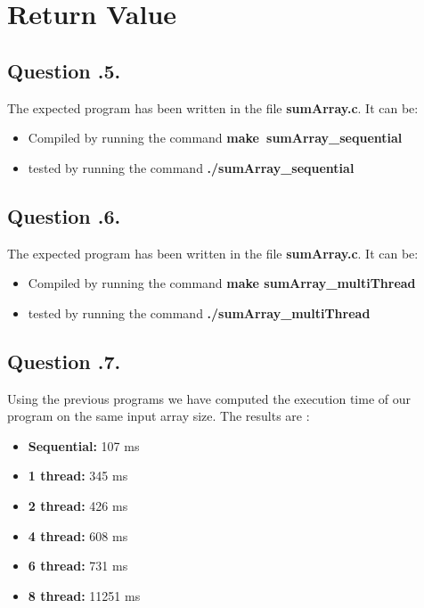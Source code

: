 \documentclass[a4paper,10pt]{article}
\begin{document}
    

\section{Return Value}
    \subsection{Question .5.}
    The expected program has been written in the file \textbf{sumArray.c}.  It can be:
    \begin{itemize}
     \item Compiled by running the command \textbf{make\ sumArray\_sequential}
     \item tested by running the command \textbf{./sumArray\_sequential}
    \end{itemize}

    \subsection{Question .6.}
    The expected program has been written in the file \textbf{sumArray.c}.  It can be:
    \begin{itemize}
     \item Compiled by running the command \textbf{make sumArray\_multiThread}
     \item tested by running the command \textbf{./sumArray\_multiThread}
    \end{itemize}

    \subsection{Question .7.}
    Using the previous programs we have computed the execution time of our program on the same input array size.  The results are :
    \begin{itemize}
     \item \textbf{Sequential: } 107 ms
     \item \textbf{1 thread:   } 345 ms
     \item \textbf{2 thread:   } 426 ms
     \item \textbf{4 thread:   } 608 ms
     \item \textbf{6 thread:   } 731 ms
     \item \textbf{8 thread:   } 11251 ms
    \end{itemize}
    
\end{document}
